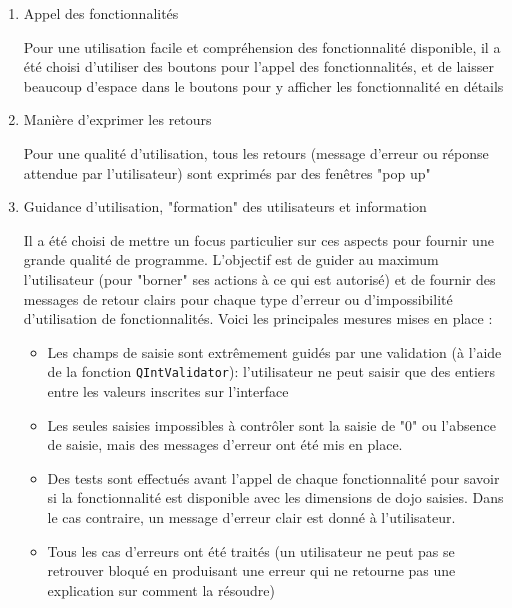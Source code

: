 \begin{enumerate}
    \item Appel des fonctionnalités

          Pour une utilisation facile et compréhension des fonctionnalité disponible, il a été choisi
          d'utiliser des boutons pour l’appel des fonctionnalités, et de laisser beaucoup d’espace
          dans le boutons pour y afficher les fonctionnalité en détails
    \item Manière d’exprimer les retours

          Pour une qualité d’utilisation, tous les retours (message d’erreur ou réponse attendue par l’utilisateur)
          sont exprimés par des fenêtres "pop up"
    \item Guidance d’utilisation, "formation" des utilisateurs et information

          Il a été choisi de mettre un focus particulier sur ces aspects pour fournir une grande qualité de programme.
          L’objectif est de guider au maximum l’utilisateur (pour "borner" ses actions à ce qui est autorisé) et
          de fournir des messages de retour clairs pour chaque type d’erreur ou d'impossibilité d’utilisation de fonctionnalités.
          Voici les principales mesures mises en place :
          \begin{itemize}
              \item Les champs de saisie sont extrêmement guidés par une validation (à l'aide de la fonction \texttt{QIntValidator}):
                    l’utilisateur ne peut saisir que des entiers entre les valeurs inscrites sur l’interface
              \item Les seules saisies impossibles à contrôler sont la saisie de "0" ou l’absence de saisie, mais des messages d’erreur
                    ont été mis en place.
              \item Des tests sont effectués avant l’appel de chaque fonctionnalité pour savoir si la fonctionnalité est disponible avec
                    les dimensions de dojo saisies. Dans le cas contraire, un message d’erreur clair est donné à l'utilisateur.
              \item Tous les cas d’erreurs ont été traités (un utilisateur ne peut pas se retrouver bloqué en produisant une erreur
                    qui ne retourne pas une explication sur comment la résoudre)
          \end{itemize}

\end{enumerate}


